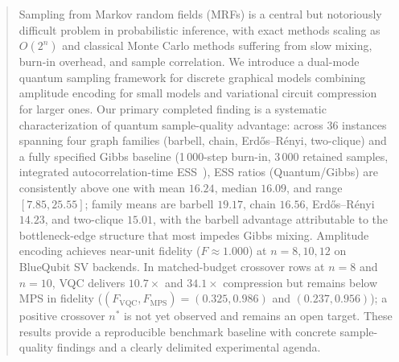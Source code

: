 %



\begin{abstract}
    Sampling from Markov random fields (MRFs) is a central but notoriously
    difficult problem in probabilistic inference, with exact methods scaling as
    $O(2^n)$ and classical Monte Carlo methods suffering from slow mixing,
    burn-in overhead, and sample correlation. We introduce a dual-mode quantum
    sampling framework for discrete graphical models combining amplitude encoding
    for small models and variational circuit compression for larger ones. Our
    primary completed finding is a systematic characterization of quantum
    sample-quality advantage: across 36 instances spanning four graph families
    (barbell, chain, Erd\H{o}s--R\'enyi, two-clique) and a fully specified Gibbs
    baseline (1\,000-step burn-in, 3\,000 retained samples, integrated
    autocorrelation-time ESS~\cite{geyer1992practical}), ESS ratios
    (Quantum/Gibbs) are consistently above one with mean $16.24$, median
    $16.09$, and range $[7.85, 25.55]$; family means are barbell $19.17$,
    chain $16.56$, Erd\H{o}s--R\'enyi $14.23$, and two-clique $15.01$, with
    the barbell advantage attributable to the bottleneck-edge structure that
    most impedes Gibbs mixing. Amplitude encoding achieves near-unit fidelity
    ($F \approx 1.000$) at $n = 8, 10, 12$ on BlueQubit SV backends. In
    matched-budget crossover rows at $n = 8$ and $n = 10$, VQC delivers
    $10.7\times$ and $34.1\times$ compression but remains below MPS in
    fidelity ($(F_{\mathrm{VQC}}, F_{\mathrm{MPS}}) = (0.325, 0.986)$ and
    $(0.237, 0.956)$); a positive crossover $n^*$ is not yet observed and
    remains an open target. These results provide a reproducible benchmark
    baseline with concrete sample-quality findings and a clearly delimited
    experimental agenda.
    \end{abstract}
    
